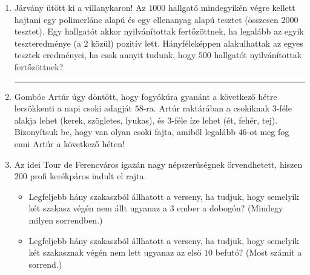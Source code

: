 \documentclass[a4paper,12pt]{article}
\begin{document}
\begin{enumerate}



        \item Járvány ütött ki a villanykaron! Az $1000$ hallgató mindegyikén végre kellett hajtani egy polimerlánc alapú és egy ellenanyag alapú tesztet (összesen $2000$ tesztet). Egy hallgatót akkor nyilvánítottak fertőzöttnek, ha legalább az egyik teszteredménye (a $2$ közül) pozitív lett. Hányféleképpen alakulhattak az egyes tesztek eredményei, ha csak annyit tudunk, hogy $500$ hallgatót nyilvánítottak fertőzöttnek?

        \hrule

        \item Gombóc Artúr úgy döntött, hogy fogyókúra gyanánt a következő hétre lecsökkenti a napi csoki adagját $58$-ra. Artúr raktárában a csokiknak $3$-féle alakja lehet (kerek, szögletes, lyukas), és $3$-féle íze lehet (ét, fehér, tej). Bizonyítsuk be, hogy van olyan csoki fajta, amiből legalább $46$-ot meg fog enni Artúr a következő héten!
        
        \item Az idei Tour de Ferencváros igazán nagy népszerűségnek örvendhetett, hiszen $200$ profi kerékpáros indult el rajta.
            \begin{itemize}
                \item Legfeljebb hány szakaszból állhatott a verseny, ha tudjuk, hogy semelyik két szakasz végén nem állt ugyanaz a $3$ ember a dobogón? (Mindegy milyen sorrendben.)
                \item Legfeljebb hány szakaszból állhatott a verseny, ha tudjuk, hogy semelyik két szakasznak végén nem lett ugyanaz az első $10$ befutó? (Most számít a sorrend.)
            \end{itemize}
        

\end{enumerate}
\end{document}
